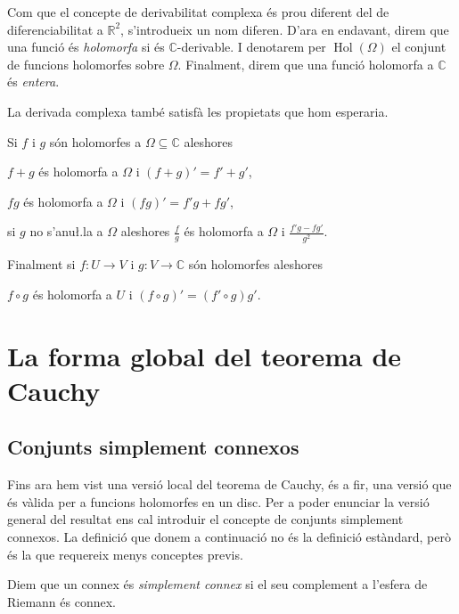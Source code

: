 \documentclass[12pt,twoside]{report}
\numberwithin{table}{section}
\numberwithin{equation}{section}
\numberwithin{figure}{section}
\newcommand{\R}{\ensuremath{\mathbb{R}}}
\newcommand{\C}{\ensuremath{\mathbb{C}}}
\DeclareMathOperator{\Hol}{Hol}
\begin{document}
Com que el concepte de derivabilitat complexa és prou diferent del de diferenciabilitat a \( \R^2 \), s'introdueix un nom diferen. D'ara en endavant, direm que una funció és \emph{holomorfa} si és \( \C \)-derivable. I denotarem per \( \Hol{(\Omega)} \) el conjunt de funcions holomorfes sobre \( \Omega \). Finalment, direm que una funció holomorfa a \( \C \) és \emph{entera}.

La derivada complexa també satisfà les propietats que hom esperaria.
\begin{prop}
	Si \( f \) i \( g \) són holomorfes a \( \Omega \subseteq \C \) aleshores
	\begin{punts}
	\item \( f + g \) és holomorfa a \( \Omega \) i \( (f + g)' = f' + g' \),
	\item \( fg \) és holomorfa a \( \Omega \) i \( (fg)' = f'g + fg' \),
	\item	si \( g \) no s'anu\l.la a \( \Omega \) aleshores \( \frac{f}{g} \) és holomorfa a \( \Omega \) i \( \frac{f'g - fg'}{g^2} \).
	\end{punts}
	Finalment si \( f \colon U \to V \) i \( g \colon V \to \C \) són holomorfes aleshores 
	\begin{punts}[resume]
	\item \( f \circ g \) és holomorfa a \( U \) i \( (f \circ g)' = (f' \circ g)g' \).
	\end{punts}
\end{prop}

\section{La forma global del teorema de Cauchy}
\subsection{Conjunts simplement connexos}
Fins ara hem vist una versió local del teorema de Cauchy, és a fir, una versió que és vàlida per a funcions holomorfes en un disc. Per a poder enunciar la versió general del resultat ens cal introduir el concepte de conjunts simplement connexos. La definició que donem a continuació no és la definició estàndard, però és la que requereix menys conceptes previs.   

\begin{defn}
	Diem que un connex és \emph{simplement connex} si el seu complement a l'esfera de Riemann és connex.
\end{defn}
\end{document}
